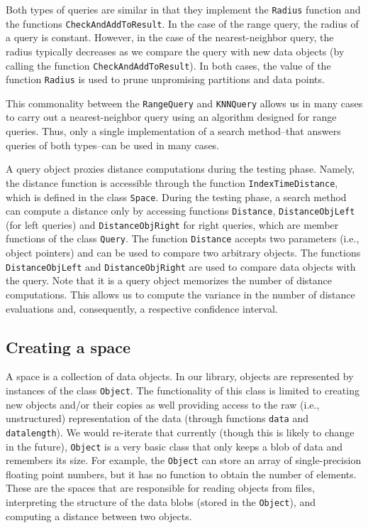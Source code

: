 \documentclass[runningheads,a4paper]{llncs}
\newcommand{\ttt}[1]{\texttt{#1}}
\begin{document}
{Both types of queries are similar in that they implement the \ttt{Radius} function
and the functions \ttt{CheckAndAddToResult}. 
In the case of the range query, the radius of a query is constant.
However, in the case of the nearest-neighbor query,
the radius typically decreases as we compare the query
with new data objects (by calling the function \ttt{CheckAndAddToResult}).
In both cases, the value of the function \ttt{Radius} is used to prune unpromising
partitions and data points.

This commonality between the \ttt{RangeQuery} and \ttt{KNNQuery}
allows us in many cases to carry out a nearest-neighbor query 
using an algorithm designed for range queries.
Thus, only a single implementation of a search method--that answers queries of both types--can be used in many cases.

A query object proxies distance computations during the testing phase.
Namely, the distance function is accessible through the function
\ttt{IndexTimeDistance}, which is defined in the class \ttt{Space}.
During the testing phase, a search method can compute a distance
only by accessing functions \ttt{Distance}, 
\ttt{DistanceObjLeft} (for left queries) and 
\ttt{DistanceObjRight} for right queries,
which are member functions of the class \ttt{Query}.
The function \ttt{Distance} accepts two parameters (i.e., object pointers) and 
can be used to compare two arbitrary objects.
The functions \ttt{DistanceObjLeft} and \ttt{DistanceObjRight} are used 
to compare data objects with the query.
Note that it is a query object  memorizes the number of distance computations.
This allows us to compute the variance in the number of distance evaluations
and, consequently, a respective confidence interval.



\subsection{Creating a space}\label{SectionCreateSpace}
A space is a collection of data objects.
In our library, objects are represented by instances
of the class \ttt{Object}.
The functionality of this class is limited to
creating new objects and/or their copies as well providing
access to the raw (i.e., unstructured) representation of the data
(through functions \ttt{data} and \ttt{datalength}).
We would re-iterate that currently (though this is likely to change in the future),
\ttt{Object} is a very basic class that only keeps a blob of data and remembers its size.
For example, the \ttt{Object} can store an array of single-precision floating point
numbers, but it has no function to obtain the number of elements.
These are the spaces that are responsible for reading objects from files,
interpreting the structure of the data blobs (stored in the \ttt{Object}), 
and computing a distance between two objects.


}
\end{document}
